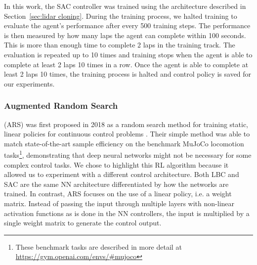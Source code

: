 \documentclass[manuscript,screen,review]{acmart}
\newcommand{\nate}[1]{\textcolor{magenta}{\textbf{\underline{Nate:}} #1}}
\begin{document}
In this work, the SAC controller was trained
using the architecture described in Section~\ref{sec:lidar cloning}. During the training process, we halted training to evaluate the agent's performance after every 500 training steps. The performance is then measured by how many laps the agent can complete within 100 seconds. This is more than enough time to complete 2 laps in the training track. The evaluation is repeated up to 10 times and training stops when the agent is able to complete at least 2 laps 10 times in a row. Once the agent is able to complete at least 2 laps 10 times, the training process is halted and control policy is saved for our experiments.

\subsubsection{Augmented Random Search} 
(ARS) was first proposed in 2018 as a random search method for training static, linear policies for continuous control problems \cite{mania2018simple}. Their simple method was able to match state-of-the-art sample efficiency on the benchmark MuJoCo locomotion tasks\footnote{These benchmark tasks are described in more detail at \url{https://gym.openai.com/envs/\#mujoco}}, demonstrating that deep neural networks might not be necessary for some complex control tasks. We chose to highlight this RL algorithm because %
it allowed us to experiment with a different control architecture. Both LBC and SAC are the same NN architecture differentiated by how the networks are trained. In contrast, ARS focuses on the use of a linear policy, i.e. a weight matrix. Instead of passing the input through multiple layers with non-linear activation functions as is done in the NN controllers, the input is multiplied by a single weight matrix to generate the control output. %
\end{document}
